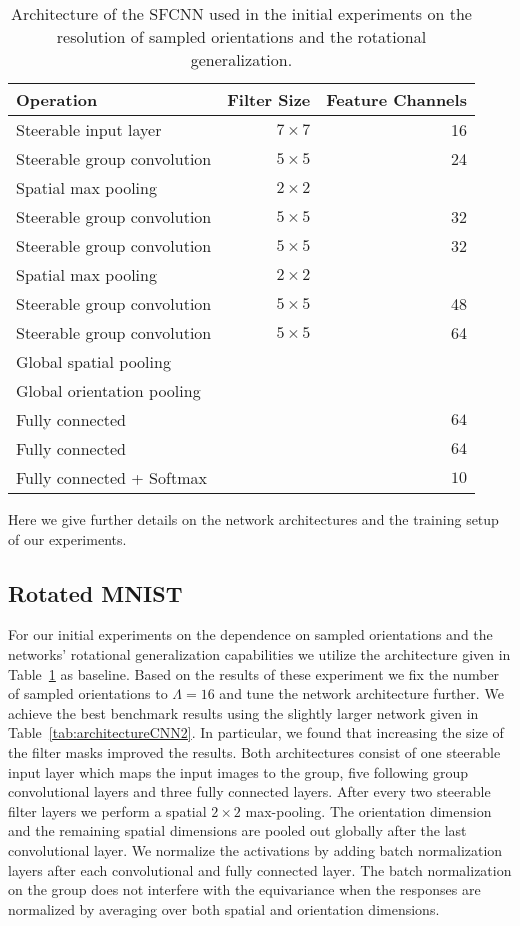 \documentclass[10pt,twocolumn,letterpaper]{article}
\begin{document}
\begin{table}[t]
	\centering
	\small
	\begin{tabular}{lrr}
		\toprule 
		Operation & Filter Size & Feature Channels \\
		\toprule 
		Steerable input layer  & $7\times 7$ &  16 \\
		Steerable group convolution  & $5\times 5$ &  24 \\
		Spatial max pooling & $2 \times 2$ & \\
		\midrule
		Steerable group convolution  & $5\times 5$ &  32 \\
		Steerable group convolution  & $5\times 5$ &  32 \\
		Spatial max pooling & $2 \times 2$ & \\
		\midrule
		Steerable group convolution  & $5\times 5$ &  48 \\
		Steerable group convolution  & $5\times 5$ &  64 \\
		Global spatial pooling \\
		Global orientation pooling \\
		\midrule
		Fully connected  & & $64$ \\
		Fully connected  & & $64$ \\
		Fully connected + Softmax  & & $10$ \\
		\bottomrule
	\end{tabular}
	\caption{Architecture of the SFCNN used in the initial experiments on the resolution of sampled orientations and the rotational generalization.}
	\label{tab:architectureCNN1}
\end{table}


Here we give further details on the network architectures and the training setup of our experiments.

\subsection{Rotated MNIST}

For our initial experiments on the dependence on sampled orientations and the networks' rotational generalization capabilities we utilize the architecture given in Table~\ref{tab:architectureCNN1} as baseline.
Based on the results of these experiment we fix the number of sampled orientations to $\Lambda=16$ and tune the network architecture further.
We achieve the best benchmark results using the slightly larger network given in Table~\ref{tab:architectureCNN2}.
In particular, we found that increasing the size of the filter masks improved the results.
Both architectures consist of one steerable input layer which maps the input images to the group, five following group convolutional layers and three fully connected layers.
After every two steerable filter layers we perform a spatial $2\times2$ max-pooling.
The orientation dimension and the remaining spatial dimensions are pooled out globally after the last convolutional layer.
We normalize the activations by adding batch normalization layers \citep{ioffe2015batch} after each convolutional and fully connected layer.
The batch normalization on the group does not interfere with the equivariance when the responses are normalized by averaging over both spatial and orientation dimensions.
\end{document}
